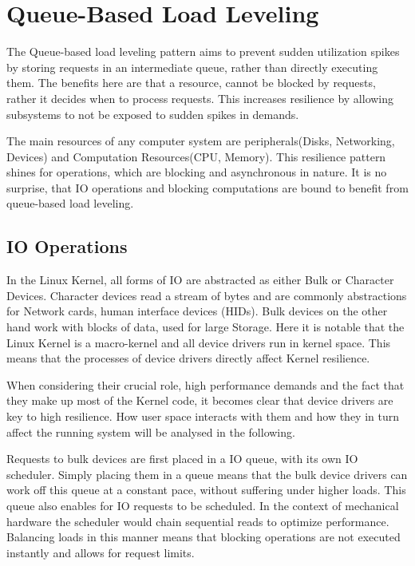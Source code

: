 \chapter{Queue-Based Load Leveling}
The Queue-based load leveling pattern aims to prevent sudden utilization spikes by storing requests in an intermediate queue, rather than directly executing them. The benefits here are that a resource, cannot be blocked by requests, rather it decides when to process requests. \cite{queue_based_load_levelling}
This increases resilience by allowing subsystems to not be exposed to sudden spikes in demands.

The main resources of any computer system are peripherals(Disks, Networking, Devices) and Computation Resources(CPU, Memory). 
This resilience pattern shines for operations, which are blocking and asynchronous in nature. It is no surprise, that IO operations and blocking computations are bound to benefit from queue-based load leveling.

\section{IO Operations}
In the Linux Kernel, all forms of IO are abstracted as either Bulk or Character Devices. Character devices read a stream of bytes and are commonly abstractions for Network cards, human interface devices (HIDs). Bulk devices on the other hand work with blocks of data, used for large Storage.
Here it is notable that the Linux Kernel is a macro-kernel and all device drivers run in kernel space. This means that the processes of device drivers directly affect Kernel resilience.

When considering their crucial role, high performance demands and the fact that they make up most of the Kernel code, it becomes clear that device drivers are key to high resilience. How user space interacts with them and how they in turn affect the running system will be analysed in the following.

Requests to bulk devices are first placed in a IO queue, with its own IO scheduler. Simply placing them in a queue means that the bulk device drivers can work off this queue at a constant pace, without suffering under higher loads. This queue also enables for IO requests to be scheduled. In the context of mechanical hardware the scheduler would chain sequential reads to optimize performance. \cite{blk_mq}
Balancing loads in this manner means that blocking operations are not executed instantly and allows for request limits.

